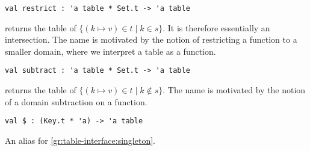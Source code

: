 \begin{cluster}
\label{grp:grm:table-interface::restrict}

\begin{gram}[restrict]
\label{grm:table-interface::restrict}
\begin{verbatim}
val restrict : 'a table * Set.t -> 'a table
\end{verbatim}
 returns the table of $\{(k \mapsto v) \in t \mathbin| k \in s\}$.
It is therefore essentially an intersection. The name is motivated by the
notion of restricting a function to a smaller domain, where we interpret a table
as a function.

\end{gram}
\end{cluster}

\begin{cluster}
\label{grp:grm:table-interface::subtract}

\begin{gram}[subtract]
\label{grm:table-interface::subtract}
\begin{verbatim}
val subtract : 'a table * Set.t -> 'a table
\end{verbatim}
 returns the table of
$\{(k \mapsto v) \in t \mathbin| k \not\in s\}$.
The name is motivated by the notion of a domain subtraction on a function.

\end{gram}
\end{cluster}

\begin{cluster}
\label{grp:grm:table-interface::alias}

\begin{gram}[\$]
\label{grm:table-interface::alias}
\begin{verbatim}
val $ : (Key.t * 'a) -> 'a table
\end{verbatim}
An alias for \ref{gr:table-interface:singleton}.

\end{gram}
\end{cluster}

